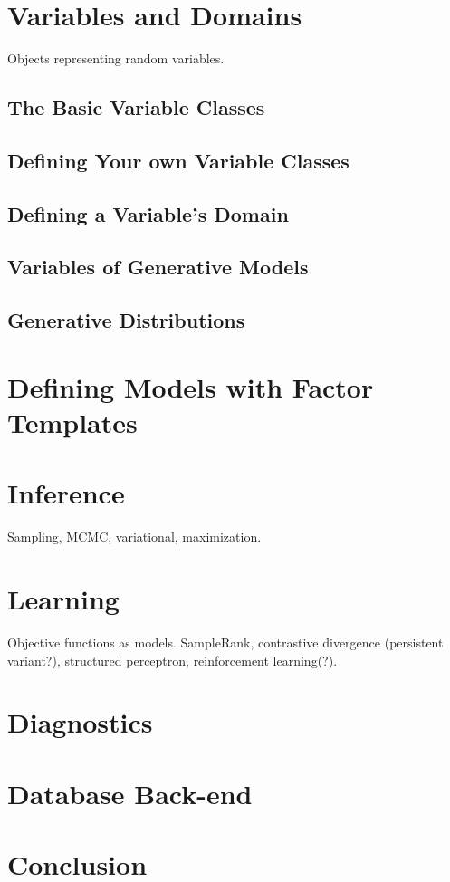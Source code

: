 \documentclass[]{manual}
\begin{document}
\chapter{Variables and Domains}
\label{chap:variables}

Objects representing random variables.

\section{The Basic Variable Classes}
\section{Defining Your own Variable Classes}
\section{Defining a Variable's Domain}
\section{Variables of Generative Models}
\section{Generative Distributions}


\chapter{Defining Models with Factor Templates}
\label{chap:models}


\chapter{Inference}
\label{chap:inference}

Sampling, MCMC, variational, maximization.


\chapter{Learning}
\label{chap:learning}

Objective functions as models. SampleRank, contrastive divergence (persistent variant?), structured perceptron, reinforcement learning(?).


\chapter{Diagnostics}
\label{chap:diagnostics}

\chapter{Database Back-end}
\label{chap:database}

\chapter{Conclusion}
\label{chap:conclusion}





\end{document}
